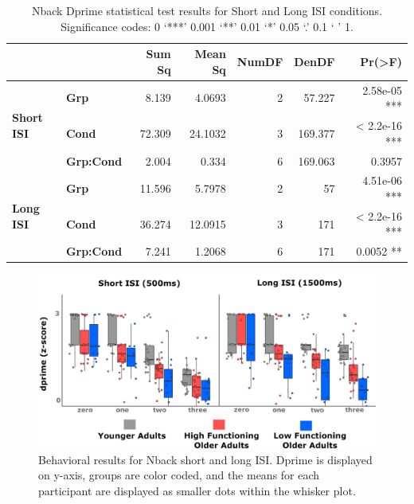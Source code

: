 \documentclass[a4paper,fleqn]{cas-sc}
\begin{document}
\begin{table}[h!]
\caption{Nback Dprime statistical test results for Short and Long ISI conditions. Significance codes: 0 ‘***’ 0.001 ‘**’ 0.01 ‘*’ 0.05 ‘.’ 0.1 ‘ ’ 1.}
\label{tab:nback_dprime_results}
\centering
\begin{tabular}{llrrrrr}
\toprule
\multirow{2}{*}{}               & \multirow{2}{*}{}          & \textbf{Sum Sq  } &  \textbf{Mean Sq} & \textbf{NumDF} & \textbf{DenDF} & \textbf{Pr(>F)}          \\ 

\midrule
\multirow{3}{*}{\textbf{Short ISI}} 
                                & \textbf{Grp}              & 8.139            & 4.0693            & 2               & 57.227          & 2.58e-05 ***             \\
                                & \textbf{Cond}             & 72.309           & 24.1032           & 3               & 169.377         & < 2.2e-16 ***            \\
                                & \textbf{Grp:Cond}         & 2.004            & 0.334             & 6               & 169.063         & 0.3957                   \\ 
\midrule
\multirow{3}{*}{\textbf{Long ISI}}
                                & \textbf{Grp}              & 11.596           & 5.7978            & 2               & 57              & 4.51e-06 ***             \\
                                & \textbf{Cond}             & 36.274           & 12.0915           & 3               & 171             & < 2.2e-16 ***            \\
                                & \textbf{Grp:Cond}         & 7.241            & 1.2068            & 6               & 171             & 0.0052 **                \\ 
\bottomrule
\end{tabular}
\end{table}


\begin{figure}[h]
    \centering
    \includegraphics[clip, trim=0 0 0 0, scale=0.75]{figs/nback_dprime.png} %
    \caption{Behavioral results for Nback short and long ISI. Dprime is displayed on y-axis, groups are color coded, and the means for each participant are displayed as smaller dots within the whisker plot. }
    \label{fig:dprime}
\end{figure}
\end{document}
